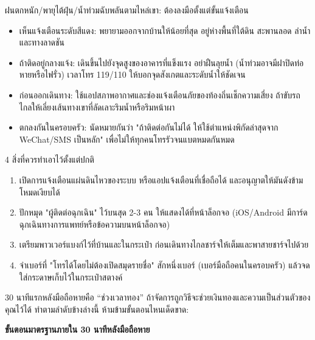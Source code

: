 \begin{tcbwarn}{ฝนตกหนัก/พายุไต้ฝุ่น/น้ำท่วมฉับพลันตามไหล่เขา: ต้องลงมือตั้งแต่ขั้นแจ้งเตือน}
\begin{itemize}
  \item เห็นแจ้งเตือนระดับสีแดง: พยายามออกจากบ้านให้น้อยที่สุด อยู่ห่างพื้นที่ใต้ดิน สะพานลอด ลำน้ำ และทางลาดชัน
  \item ถ้าติดอยู่กลางแจ้ง: เดินขึ้นไปยังจุดสูงของอาคารที่แข็งแรง อย่าฝืนลุยน้ำ (น้ำท่วมอาจมีฝาปิดท่อหายหรือไฟรั่ว) เวลาโทร 119/110 ให้บอกจุดสังเกตและระดับน้ำให้ชัดเจน
  \item ก่อนออกเดินทาง: ใช้แอปสภาพอากาศและช่องแจ้งเตือนภัยของท้องถิ่นเช็กความเสี่ยง ถ้าขับรถไกลให้เลี่ยงเส้นทางเขาที่ลัดเลาะริมน้ำหรือริมหน้าผา
  \item ตกลงกันในครอบครัว: นัดหมายกันว่า "ถ้าติดต่อกันไม่ได้ ให้ใช้ตำแหน่งพิกัดล่าสุดจาก WeChat/SMS เป็นหลัก" เพื่อไม่ให้ทุกคนโทรรัวจนแบตหมดกันหมด
\end{itemize}

\end{tcbwarn}

\begin{tcbpractice}{4 สิ่งที่ควรทำเอาไว้ตั้งแต่ปกติ}
\begin{enumerate}
  \item เปิดการแจ้งเตือนแผ่นดินไหวของระบบ หรือแอปแจ้งเตือนที่เชื่อถือได้ และอนุญาตให้มันดังข้ามโหมดเงียบได้
  \item ปักหมุด "ผู้ติดต่อฉุกเฉิน" ไว้บนสุด 2-3 คน ให้แสดงได้ที่หน้าล็อกจอ (iOS/Android มีการ์ดฉุกเฉินทางการแพทย์หรือข้อความบนหน้าล็อกจอ)
  \item เตรียมพาวเวอร์แบงก์ไว้ที่บ้านและในกระเป๋า ก่อนเดินทางไกลชาร์จให้เต็มและพาสายชาร์จไปด้วย
  \item จำเบอร์ที่ "โทรได้โดยไม่ต้องเปิดสมุดรายชื่อ" สักหนึ่งเบอร์ (เบอร์มือถือคนในครอบครัว) แล้วจดใส่กระดาษเก็บไว้ในกระเป๋าสตางค์
\end{enumerate}

\end{tcbpractice}


30 นาทีแรกหลังมือถือหายคือ “ช่วงเวลาทอง” ถ้าจัดการถูกวิธีจะช่วยเงินทองและความเป็นส่วนตัวของคุณไว้ได้ ทำตามลำดับข้างล่างนี้ ห้ามข้ามขั้นตอนไหนเด็ดขาด:

\textbf{ขั้นตอนมาตรฐานภายใน 30 นาทีหลังมือถือหาย}\par

